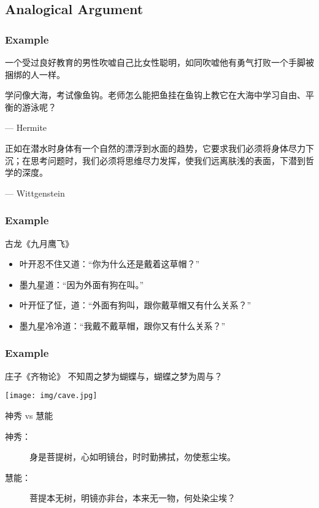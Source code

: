 \documentclass[UTF8,11pt,colorlinks,compress,openany]{beamer}%
\begin{document}
\subsection{Analogical Argument}

\begin{frame}\frametitle{Example}
	\begin{block}{}
		一个受过良好教育的男性吹嘘自己比女性聪明，如同吹嘘他有勇气打败一个手脚被捆绑的人一样。
	\end{block}
	\begin{block}{}
		学问像大海，考试像鱼钩。老师怎么能把鱼挂在鱼钩上教它在大海中学习自由、平衡的游泳呢？\par \hfill --- Hermite
	\end{block}
	\begin{block}{}
		正如在潜水时身体有一个自然的漂浮到水面的趋势，它要求我们必须将身体尽力下沉；在思考问题时，我们必须将思维尽力发挥，使我们远离肤浅的表面，下潜到哲学的深度。\par \hfill --- Wittgenstein
	\end{block}
\end{frame}

\begin{frame}\frametitle{Example}
\begin{block}{古龙《九月鹰飞》}
	\begin{itemize}
		\item 叶开忍不住又道：“你为什么还是戴着这草帽？”
		\item 墨九星道：“因为外面有狗在叫。”
		\item 叶开怔了怔，道：“外面有狗叫，跟你戴草帽又有什么关系？”
		\item 墨九星冷冷道：“我戴不戴草帽，跟你又有什么关系？”
	\end{itemize}
\end{block}
\end{frame}

\begin{frame}\frametitle{Example}
\begin{block}{庄子《齐物论》}
	不知周之梦为蝴蝶与，蝴蝶之梦为周与？
\end{block}\centering
\texttt{[image: img/cave.jpg]}
\begin{block}{神秀 vs 慧能}
\begin{description}
	\item[神秀：] 身是菩提树，心如明镜台，时时勤拂拭，勿使惹尘埃。
	\item[慧能：] 菩提本无树，明镜亦非台，本来无一物，何处染尘埃？
\end{description}
\end{block}
\end{frame}
\end{document}
